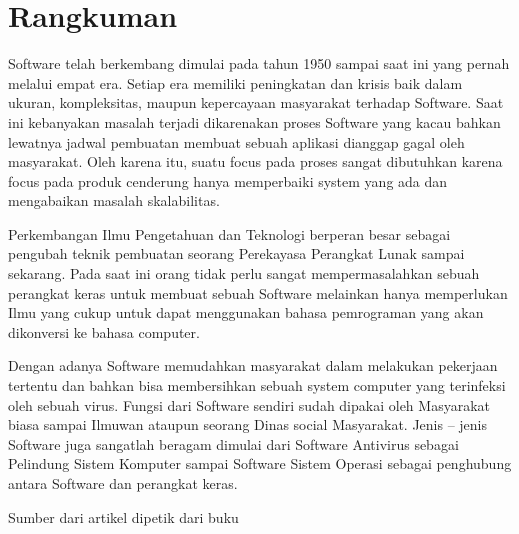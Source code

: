 \section{Rangkuman}
\begin{flushleft}
Software telah berkembang dimulai pada tahun 1950 sampai saat ini yang pernah melalui empat  era. Setiap era memiliki peningkatan dan krisis baik dalam ukuran, kompleksitas, maupun kepercayaan masyarakat terhadap Software. Saat ini kebanyakan masalah terjadi dikarenakan proses Software yang kacau bahkan lewatnya jadwal pembuatan membuat sebuah aplikasi dianggap gagal oleh masyarakat. Oleh karena itu, suatu focus pada proses sangat dibutuhkan karena focus pada produk cenderung hanya memperbaiki system yang ada dan mengabaikan masalah skalabilitas.
\end{flushleft}
\begin{flushleft}
Perkembangan Ilmu Pengetahuan dan Teknologi berperan besar sebagai pengubah teknik pembuatan seorang Perekayasa Perangkat Lunak sampai sekarang. Pada saat ini orang tidak perlu  sangat mempermasalahkan sebuah perangkat keras untuk membuat sebuah Software melainkan hanya memperlukan Ilmu yang cukup untuk dapat menggunakan bahasa pemrograman yang akan dikonversi ke bahasa computer. 
\end{flushleft}
\begin{flushleft}
Dengan adanya Software memudahkan masyarakat dalam melakukan pekerjaan tertentu dan bahkan bisa membersihkan sebuah system computer yang terinfeksi oleh sebuah virus. Fungsi dari Software sendiri sudah dipakai oleh Masyarakat biasa sampai Ilmuwan ataupun seorang Dinas social Masyarakat. Jenis – jenis Software juga sangatlah beragam dimulai dari Software Antivirus sebagai Pelindung Sistem Komputer sampai Software Sistem Operasi sebagai penghubung antara Software dan perangkat keras.
\end{flushleft}
Sumber dari artikel dipetik dari buku \cite{simarmata2010rekayasa}

